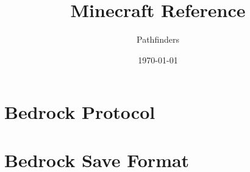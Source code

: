 \documentclass[12pt]{report}
\title{Minecraft Reference}
\author{Pathfinders}
\date{\today}
\begin{document}
\maketitle
\tableofcontents    



\chapter{Bedrock Protocol}

\chapter{Bedrock Save Format}
\end{document}
